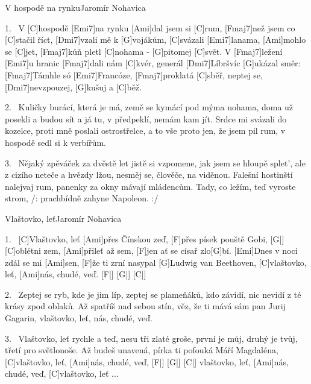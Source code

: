 \begin{song}{V hospodě na rynku}{Jaromír Nohavica}

\begin{xverse}{1.~}
V [C]hospodě [Emi7]na rynku [Ami]dal jsem si [C]rum,
[Fmaj7]než jsem co [C]stačil říct, [Dmi7]vzali mě k [G]vojákům,
[C]svázali [Emi7]lanama, [Ami]mohlo se [C]jet,
[Fmaj7]kůň pletl [C]nohama - [G]pitomej [C]svět.
V [Fmaj7]ležení [Emi7]u hranic [Fmaj7]dali nám [C]kvér,
generál [Dmi7]Líbršvíc [G]ukázal směr:
[Fmaj7]Támhle só [Emi7]Francóze, [Fmaj7]proklatá [C]sběř,
neptej se, [Dmi7]nevzpouzej, [G]kušuj a [C]běž.
\end{xverse}

\begin{xverse}{2.~}
Kuličky burácí, která je má,
země se kymácí pod mýma nohama,
doma už posekli a budou sít
a já tu, v předpeklí, nemám kam jít.
Srdce mi svázali do kozelce,
proti mně poslali ostrostřelce,
a to vše proto jen, že jsem pil rum,
v hospodě sedl si k verbířům.
\end{xverse}

\begin{xverse}{3.~}
Nějaký zpěváček za dvěstě let
jistě si vzpomene, jak jsem se hloupě splet',
ale z cizího neteče a hvězdy lžou,
nesměj se, člověče, na viděnou.
Falešní hostinští nalejvaj rum,
panenky za okny mávají mládencům.
Tady, co ležím, teď vyroste strom,
/: prachbídně zahyne Napoleon. :/
\end{xverse}
\end{song}

\begin{song}{Vlaštovko, leť}{Jaromír Nohavica}

\begin{xverse}{1.~}
[C]Vlaštovko, leť [Ami]přes Čínskou zeď,
[F]přes písek pouště Gobi, [G|]{}
[C]oblétni zem, [Ami]přileť až sem,
[F]jen ať se císař zlo[G]bí.
[Emi]Dnes v noci zdál se mi [Ami]sen,
[F]{že} ti zrní nasypal [G]Ludwig van Beethoven,
[C]vlaštovko, leť, [Ami]nás, chudé, veď. [F|]{} [G|]{} [C|]{}
\end{xverse}

\begin{xverse}{2.~}
Zeptej se ryb, kde je jim líp,
zeptej se plameňáků,
kdo závidí, nic nevidí
z té krásy zpod oblaků.
Až spatříš nad sebou stín,
věz, že ti mává sám pan Jurij Gagarin,
vlaštovko, leť, nás, chudé, veď.
\end{xverse}

\begin{xverse}{3.~}
Vlaštovko, leť rychle a teď,
nesu tři zlaté groše,
první je můj, druhý je tvůj,
třetí pro světlonoše.
Až budeš unavená,
pírka ti pofouká Máří Magdaléna,
[C]vlaštovko, leť, [Ami]nás, chudé, veď, [F|]{} [G|]{} [C|]{}
vlaštovko, leť, [Ami]nás, chudé, veď,
[C]vlaštovko, leť ...
\end{xverse}

\end{song}







